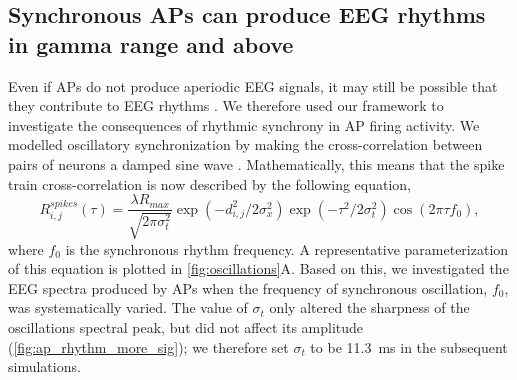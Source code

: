 \subsection{Synchronous APs can produce EEG rhythms in gamma range and above}
Even if APs do not produce aperiodic EEG signals, it may still be possible that they contribute to EEG rhythms \cite{Thio2023}. We therefore used our framework to investigate the consequences of rhythmic synchrony in AP firing activity. We modelled oscillatory synchronization by making the cross-correlation between pairs of neurons a damped sine wave \cite{Engel1990, Engel1991}. Mathematically, this means that the spike train cross-correlation is now described by the following equation,
\begin{equation} \label{eq:rhythmic_synchrony}
    R^{spikes}_{i,j}(\tau) = \frac{\lambda R_{max}}{\sqrt{2\pi \sigma_t^2}} \exp(-d_{i,j}^2 / 2\sigma_x^2) \exp(-\tau^2/2\sigma_t^2) \cos(2\pi\tau f_0),
\end{equation} 
where $f_0$ is the synchronous rhythm frequency. A representative parameterization of this equation is plotted in {\autoref{fig:oscillations}A}. Based on this, we investigated the EEG spectra produced by APs when the frequency of synchronous oscillation, $f_0$, was systematically varied. The value of $\sigma_t$ only altered the sharpness of the oscillations spectral peak, but did not affect its amplitude  ({\autoref{fig:ap_rhythm_more_sig}}); we therefore set $\sigma_t$ to be 11.3~\unit{\milli\second} in the subsequent simulations.

